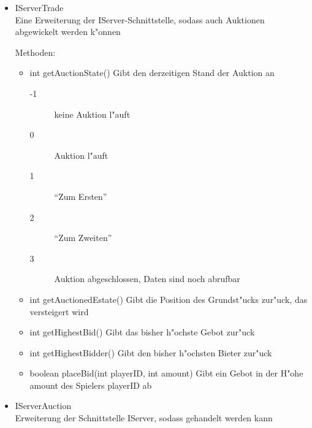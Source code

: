 \documentclass[a4paper,10pt]{article}
\begin{document}
\begin{itemize}
\item IServerTrade \\
Eine Erweiterung der IServer-Schnittstelle, sodass auch Auktionen abgewickelt werden k"onnen

Methoden:
\begin{itemize}
\item int getAuctionState()
Gibt den derzeitigen Stand der Auktion an
\begin{description}
\item[-1] keine Auktion l"auft
\item[0] Auktion l"auft
\item[1] "`Zum Ersten"'
\item[2] "`Zum Zweiten"'
\item[3] Auktion abgeschlossen, Daten sind noch abrufbar
\end{description}
\item int getAuctionedEstate()
Gibt die Position des Grundst"ucks zur"uck, das versteigert wird
\item int getHighestBid()
Gibt das bisher h"ochste Gebot zur"uck
\item int getHighestBidder()
Gibt den bisher h"ochsten Bieter zur"uck
\item boolean placeBid(int playerID, int amount)
Gibt ein Gebot in der H"ohe amount des Spielers playerID ab
\end{itemize}
\item IServerAuction \\
Erweiterung der Schnittstelle IServer, sodass gehandelt werden kann


\end{itemize}
\end{document}
